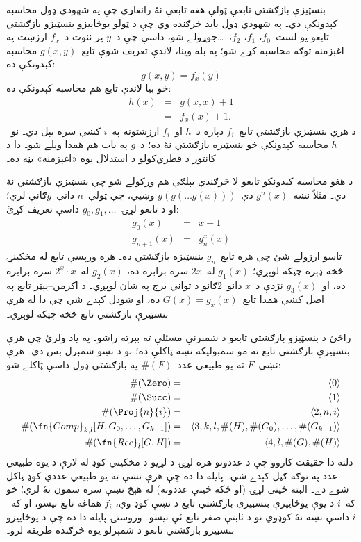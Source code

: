 \documentclass[../../../include/open-logic-section]{subfiles}
\begin{document}

بنسټيزې بازګشتي تابعې ټولې هغه تابعې نۀ رانغاړي چې په شهودي ډول محاسبه کېدونکې دي۔ په شهودي ډول بايد څرګنده وي چې د ټولو يوځاييزو بنسټيزو بازګشتي تابعو يو لست~$f_0$، $f_1$، $f_2$،~\dots جوړولے شو، داسې چې د~$y$ پر ننوت د~$f_x$ ارزښت په اغېزمنه توګه محاسبه کړے شو؛ په بله وينا، لاندې تعريف شوې تابع~$g(x,y)$ محاسبه کېدونکې ده:
\[
g(x,y) = f_x(y)
\]
خو بيا لاندې تابع هم محاسبه کېدونکې ده:
\begin{eqnarray*}
h(x) & = & g(x,x) + 1 \\
& = & f_x(x) +1.
\end{eqnarray*}
د هرې بنسټيزې بازګشتي تابع~$f_i$ دپاره د~$h$ او~$f_i$ ارزښتونه په~$i$ کښې سره بېل دي۔ نو~$h$ محاسبه کېدونکې خو بنسټيزه بازګشتي نۀ ده؛ د~$g$ په باب هم همدا ويلے شو۔ دا د کانتور د قطري‌کولو د استدلال يوه «اغېزمنه» بڼه ده۔

د هغو محاسبه کېدونکو تابعو لا څرګندې بېلګې هم ورکولے شو چې بنسټيزې بازګشتي نۀ دي۔ مثلاً نښه~$g^n(x)$ دې~$g(g(\dots g(x)))$ وښيي، چې ټولې~$n$ دانې~$g$ګانې لري؛ او د تابعو لړۍ~$g_0,g_1,\dots$ داسې تعريف کړئ:
\begin{eqnarray*}
g_0(x) & = & x+1 \\
g_{n + 1}(x) & = & g_n^x(x)
\end{eqnarray*}
تاسو ارزولے شئ چې هره تابع~$g_n$ بنسټيزه بازګشتي ده۔ هره ورپسې تابع له مخکينۍ څخه ډېره چټکه لوېږي؛ $g_1(x)$ له~$2x$ سره برابره ده، $g_2(x)$ له~$2^x \cdot x$ سره برابره ده، او~$g_3(x)$ نژدې د~$x$ دانو~$2$ګانو د تواني برج په شان لوېږي۔ د اکرمن--پېټر تابع په اصل کښې همدا تابع~$G(x) = g_x(x)$ ده، او ښودل کېدے شي چې دا له هرې بنسټيزې بازګشتي تابع څخه چټکه لوېږي۔

راځئ د بنسټيزو بازګشتي تابعو د شمېرنې مسئلې ته بېرته راشو۔ په ياد ولرئ چې هرې بنسټيزې بازګشتي تابع ته مو سمبوليکه نښه ټاکلې ده؛ نو د نښو شمېرل بس دي۔ هرې نښې~$F$ ته يو طبيعي عدد~$\#(F)$ په بازګشتي ډول داسې ټاکلے شو:
\begin{eqnarray*}
\#(\Zero) & = & \langle 0 \rangle \\
\#(\Succ) & = & \langle 1 \rangle \\
\#(\Proj{n}{i}) & = & \langle 2, n, i \rangle \\
\#(\fn{Comp}_{k,l}[H,G_0,\dots,G_{k-1}]) & = & \langle 3,k,l,\#(H),\#(G_0),\dots,\#(G_{k-1}) \rangle \\
\#(\fn{Rec}_l[G,H]) & = & \langle 4, l, \#(G), \#(H) \rangle
\end{eqnarray*}
دلته دا حقيقت کاروو چې د عددونو هره لړۍ د لړيو د مخکيني کوډ له لارې د يوه طبيعي عدد په توګه ګڼل کېدے شي۔ پايله دا ده چې هرې نښې ته يو طبيعي عددي کوډ ټاکل شوے دے۔ البته ځينې لړۍ (او ځکه ځينې عددونه) له هېڅ نښې سره سمون نۀ لري؛ خو که~$i$ د يوې يوځاييزې بنسټيزې بازګشتي تابع د نښې کوډ وي، $f_i$ هماغه تابع نيسو، او که~$i$ داسې نښه نۀ کوډوي نو د ثابتې صفر تابع ئې نيسو۔ وروستۍ پايله دا ده چې د يوځاييزو بنسټيزو بازګشتي تابعو د شمېرلو يوه څرګنده طريقه لرو۔
\end{document}
